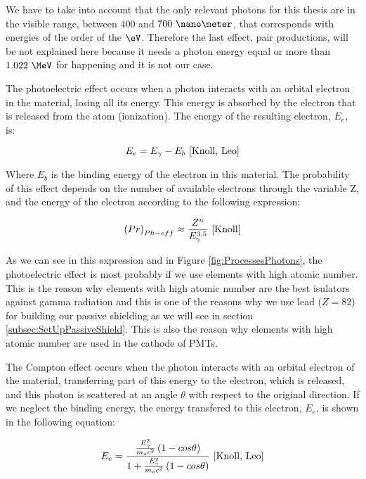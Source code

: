 We have to take into account that the only relevant photons for this thesis are in the visible range, between $400$ and $700~\nano\meter$, that corresponds with energies of the order of the $\eV$. Therefore the last effect, pair productions, will be not explained here because it needs a photon energy equal or more than $1.022~\MeV$ for happening and it is not our case.

The photoelectric effect occurs when a photon interacts with an orbital electron in the material, losing all its energy. This energy is absorbed by the electron that is released from the atom (ionization). The energy of the resulting electron, $E_e$, is:


\begin{equation}
E_e = E_\gamma - E_b ~\cite{Knoll, Leo}
\label{eq:PhotoelectricEffect}
\end{equation}

Where $E_b$ is the binding energy of the electron in this material. The probability of this effect depends on the number of available electrons through the variable Z, and the energy of the electron according to the following expression:

\begin{equation}
\left(Pr\right)_{Ph-eff} \approx \frac{Z^n}{E_\gamma^{3.5}}~\cite{Knoll}
\label{eq:PhotoelectricProb}
\end{equation}

As we can see in this expression and in Figure \ref{fig:ProcessesPhotons}, the photoelectric effect is most probably if we use elements with high atomic number. This is the reason why elements with high atomic number are the best isulators against gamma radiation and this is one of the reasons why we use lead ($Z=82$) for building our passive shielding as we will see in section \ref{subsec:SetUpPassiveShield}. This is also the reason why elements with high atomic number are used in the cathode of PMTs. 

The Compton effect occurs when the photon interacts with an orbital electron of the material, transferring part of this energy to the electron, which is released, and this photon is scattered at an angle $\theta$ with respect to the original direction. If we neglect the binding energy, the energy transfered to this electron, $E_e$, is shown in the following equation:

\begin{equation}
E_e=\frac{\frac{E_\gamma^2}{m_oc^2}\left(1-cos\theta\right)}{1+ \frac{E_\gamma^2}{m_oc^2}\left(1-cos\theta\right)}~\cite{Knoll, Leo}
\label{eq:ComptonEffect}
\end{equation}

